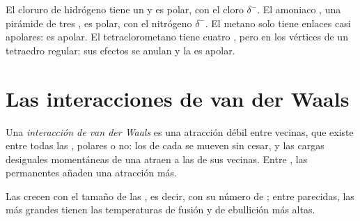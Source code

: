 \begin{example}\label{ex:g11:polarity-and-cohesion:four}
El cloruro de hidrógeno  tiene un  y es polar, con
el cloro $\delta^-$. El amoniaco , una pirámide de tres  , es polar, con el nitrógeno $\delta^-$. El metano
 solo tiene enlaces  casi apolares: es apolar. El
tetraclorometano  tiene cuatro  , pero
en los vértices de un tetraedro regular: sus efectos se anulan y la
 es apolar.
\end{example}

\section{Las interacciones de van der Waals}

\begin{definition}\label{def:g11:polarity-and-cohesion:van-der-waals}
Una \emph{interacción de van der Waals}
es una atracción débil entre  vecinas, que existe entre todas
las , polares o no: los  de cada  se mueven
sin cesar, y las cargas desiguales momentáneas de una  atraen a
las de sus vecinas. Entre , las 
permanentes añaden una atracción más.
\end{definition}


\begin{proposition}\label{prop:g11:polarity-and-cohesion:size}
Las  crecen con el tamaño de las
, es decir, con su número de ; entre 
parecidas, las más grandes tienen las temperaturas de fusión y de
ebullición más altas.
\end{proposition}

